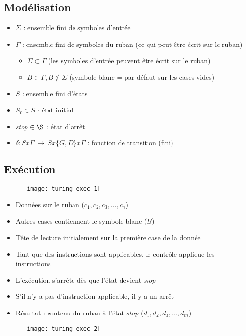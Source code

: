 \subsection{Modélisation}

\begin{itemize}
\item $\Sigma$ : ensemble fini de symboles d'entrée
\item $\Gamma$ : ensemble fini de symboles du ruban (ce qui peut être écrit sur le ruban)
	\begin{itemize}
	\item $\Sigma \subset \Gamma$ (les symboles d'entrée peuvent être écrit sur le ruban)
	\item $B \in \Gamma, B \notin \Sigma$ (symbole blanc = par défaut sur les cases vides)
	\end{itemize}
\item $S$ : ensemble fini d'états
\item $S_0 \in S$ : état initial
\item \textit{stop} $\in \S$ : état d'arrêt
\item $\delta : Sx\Gamma\ \rightarrow\ Sx\{G,D\}x\Gamma$ : fonction de transition (fini)
\end{itemize}

\newpage
\subsection{Exécution}

\begin{figure}[H]
    \centering
    \texttt{[image: turing\_exec\_1]}
\end{figure}
\begin{itemize}
\item Données sur le ruban ($c_1, c_2, c_3, ..., c_n$)
\item Autres cases contiennent le symbole blanc ($B$)
\item Tête de lecture initialement sur la première case de la donnée
\item Tant que des instructions sont applicables, le contrôle applique les instructions
\item L'exécution s'arrête dès que l'état devient \textit{stop}
\item S'il n'y a pas d'instruction applicable, il y a un arrêt
\item Résultat : contenu du ruban à l'état \textit{stop} ($d_1, d_2, d_3, ..., d_m$)
\end{itemize}
\begin{figure}[H]
    \centering
    \texttt{[image: turing\_exec\_2]}
\end{figure}

